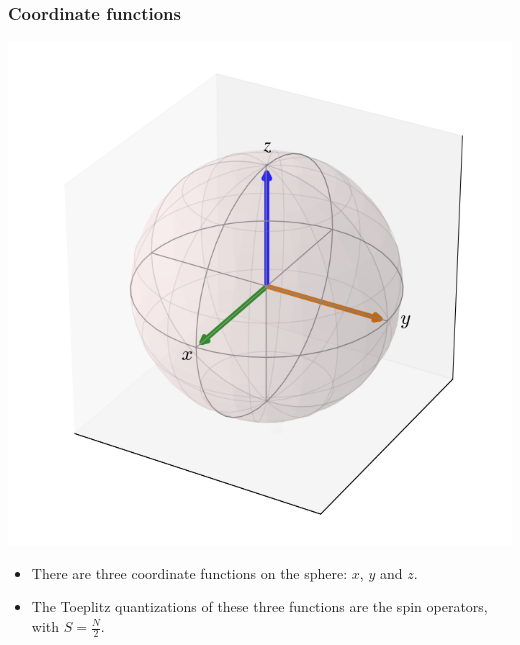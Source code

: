 \documentclass[mathserif]{beamer}
\begin{document}
\begin{frame}
	\frametitle{Coordinate functions}
	\begin{minipage}{0.44\linewidth}
	\includegraphics[scale=0.3]{sphere.png}
	\end{minipage}
	\begin{minipage}{0.55\linewidth}
	\begin{itemize}
			\item There are three coordinate functions on
                          the sphere: $x$, $y$ and $z$.
	\item The Toeplitz quantizations of these three functions are
          the spin operators, with $S=\frac{N}{2}$.
	\end{itemize}\end{minipage}
\end{frame}
\end{document}
